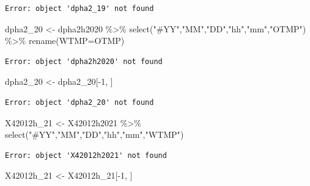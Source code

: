 \documentclass[
  letterpaper,
  DIV=11,
  numbers=noendperiod]{scrreprt}
\newenvironment{Shaded}{\begin{snugshade}}{\end{snugshade}}
\newcommand{\AttributeTok}[1]{\textcolor[rgb]{0.40,0.45,0.13}{#1}}
\newcommand{\DecValTok}[1]{\textcolor[rgb]{0.68,0.00,0.00}{#1}}
\newcommand{\FunctionTok}[1]{\textcolor[rgb]{0.28,0.35,0.67}{#1}}
\newcommand{\NormalTok}[1]{\textcolor[rgb]{0.00,0.23,0.31}{#1}}
\newcommand{\OtherTok}[1]{\textcolor[rgb]{0.00,0.23,0.31}{#1}}
\newcommand{\SpecialCharTok}[1]{\textcolor[rgb]{0.37,0.37,0.37}{#1}}
\newcommand{\StringTok}[1]{\textcolor[rgb]{0.13,0.47,0.30}{#1}}
\begin{document}
\begin{verbatim}
Error: object 'dpha2_19' not found
\end{verbatim}

\begin{Shaded}
\begin{Highlighting}[]
\NormalTok{dpha2\_20 }\OtherTok{\textless{}{-}}\NormalTok{ dpha2h2020 }\SpecialCharTok{\%\textgreater{}\%} \FunctionTok{select}\NormalTok{(}\StringTok{"\#YY"}\NormalTok{,}\StringTok{"MM"}\NormalTok{,}\StringTok{"DD"}\NormalTok{,}\StringTok{"hh"}\NormalTok{,}\StringTok{"mm"}\NormalTok{,}\StringTok{"OTMP"}\NormalTok{) }\SpecialCharTok{\%\textgreater{}\%}
  \FunctionTok{rename}\NormalTok{(}\AttributeTok{WTMP=}\NormalTok{OTMP)}
\end{Highlighting}
\end{Shaded}

\begin{verbatim}
Error: object 'dpha2h2020' not found
\end{verbatim}

\begin{Shaded}
\begin{Highlighting}[]
\NormalTok{dpha2\_20 }\OtherTok{\textless{}{-}}\NormalTok{ dpha2\_20[}\SpecialCharTok{{-}}\DecValTok{1}\NormalTok{, ]}
\end{Highlighting}
\end{Shaded}

\begin{verbatim}
Error: object 'dpha2_20' not found
\end{verbatim}

\begin{Shaded}
\begin{Highlighting}[]
\NormalTok{X42012h\_21 }\OtherTok{\textless{}{-}}\NormalTok{ X42012h2021 }\SpecialCharTok{\%\textgreater{}\%} \FunctionTok{select}\NormalTok{(}\StringTok{"\#YY"}\NormalTok{,}\StringTok{"MM"}\NormalTok{,}\StringTok{"DD"}\NormalTok{,}\StringTok{"hh"}\NormalTok{,}\StringTok{"mm"}\NormalTok{,}\StringTok{"WTMP"}\NormalTok{)}
\end{Highlighting}
\end{Shaded}

\begin{verbatim}
Error: object 'X42012h2021' not found
\end{verbatim}

\begin{Shaded}
\begin{Highlighting}[]
\NormalTok{X42012h\_21 }\OtherTok{\textless{}{-}}\NormalTok{ X42012h\_21[}\SpecialCharTok{{-}}\DecValTok{1}\NormalTok{, ]}
\end{Highlighting}
\end{Shaded}
\end{document}
